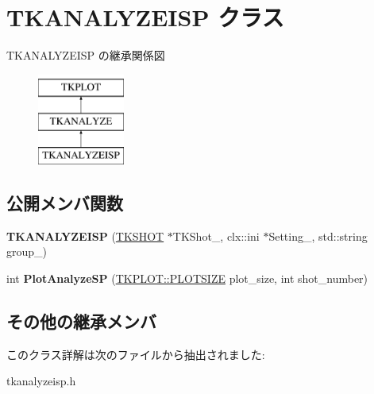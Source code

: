 \hypertarget{class_t_k_a_n_a_l_y_z_e_i_s_p}{}\section{T\+K\+A\+N\+A\+L\+Y\+Z\+E\+I\+SP クラス}
\label{class_t_k_a_n_a_l_y_z_e_i_s_p}
T\+K\+A\+N\+A\+L\+Y\+Z\+E\+I\+SP の継承関係図\begin{figure}[H]
\begin{center}
\leavevmode
\includegraphics[height=3.000000cm]{class_t_k_a_n_a_l_y_z_e_i_s_p}
\end{center}
\end{figure}
\subsection*{公開メンバ関数}
\begin{DoxyCompactItemize}
\item 
\mbox{\label{class_t_k_a_n_a_l_y_z_e_i_s_p_ad7af6efda43ab5c62bbddd8a8b39f2ef}} 
{\bfseries T\+K\+A\+N\+A\+L\+Y\+Z\+E\+I\+SP} (\hyperlink{class_t_k_s_h_o_t}{T\+K\+S\+H\+OT} $\ast$T\+K\+Shot\+\_\+, clx\+::ini $\ast$Setting\+\_\+, std\+::string group\+\_\+)
\item 
\mbox{\label{class_t_k_a_n_a_l_y_z_e_i_s_p_a04ffee51cd9091aa6edb0ada63a0c455}} 
int {\bfseries Plot\+Analyze\+SP} (\hyperlink{class_t_k_p_l_o_t_a158082ae168750554cf23edde9a27416}{T\+K\+P\+L\+O\+T\+::\+P\+L\+O\+T\+S\+I\+ZE} plot\+\_\+size, int shot\+\_\+number)
\end{DoxyCompactItemize}
\subsection*{その他の継承メンバ}


このクラス詳解は次のファイルから抽出されました\+:\begin{DoxyCompactItemize}
\item 
tkanalyzeisp.\+h\end{DoxyCompactItemize}
